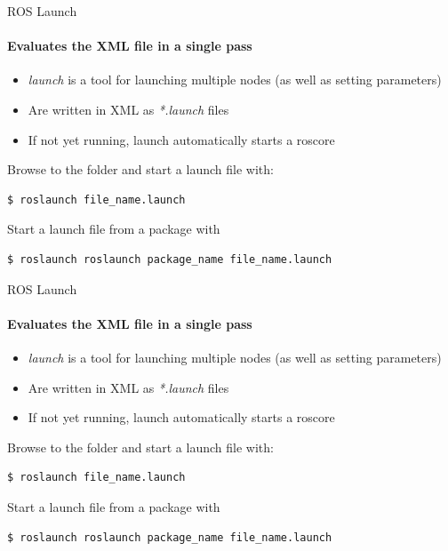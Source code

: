 \documentclass[aspectratio=169]{beamer}
\begin{document}
\begin{frame}[fragile]{ROS Launch}
	\framesubtitle{Evaluates the XML file in a single pass}
	\begin{itemize}
		\item \textit{launch} is a tool for launching multiple nodes (as well as setting parameters)
		\item Are written in XML as \textit{*.launch} files
		\item If not yet running, launch automatically starts a roscore
	\end{itemize}

	Browse to the folder and start a launch file with:
	
	\begin{lstlisting}[language=bash]
		$ roslaunch file_name.launch
	\end{lstlisting}

	Start a launch file from a package with

	\begin{lstlisting}[language=bash]
		$ roslaunch roslaunch package_name file_name.launch
	\end{lstlisting}
\end{frame}


\begin{frame}[fragile]{ROS Launch}
	\framesubtitle{Evaluates the XML file in a single pass}
	\begin{itemize}
		\item \textit{launch} is a tool for launching multiple nodes (as well as setting parameters)
		\item Are written in XML as \textit{*.launch} files
		\item If not yet running, launch automatically starts a roscore
	\end{itemize}

	Browse to the folder and start a launch file with:
	
	\begin{lstlisting}[language=bash]
		$ roslaunch file_name.launch
	\end{lstlisting}

	Start a launch file from a package with

	\begin{lstlisting}[language=bash]
		$ roslaunch roslaunch package_name file_name.launch
	\end{lstlisting}
\end{frame}
\end{document}
